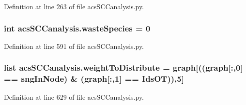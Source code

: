Definition at line 263 of file acs\-S\-C\-Canalysis.\-py.

\hypertarget{a00097_ace0de61f3c6aa14b4197156be3a68280}{
\subsubsection[{waste\-Species}]{\setlength{\rightskip}{0pt plus 5cm}int acs\-S\-C\-Canalysis.\-waste\-Species = 0}}\label{a00097_ace0de61f3c6aa14b4197156be3a68280}


Definition at line 591 of file acs\-S\-C\-Canalysis.\-py.

\hypertarget{a00097_a5162bfbe5eb2618736d1f77bb3125a9b}{
\subsubsection[{weight\-To\-Distribute}]{\setlength{\rightskip}{0pt plus 5cm}list acs\-S\-C\-Canalysis.\-weight\-To\-Distribute = {\bf graph}\mbox{[}(({\bf graph}\mbox{[}\-:,0\mbox{]} == sng\-In\-Node) \& ({\bf graph}\mbox{[}\-:,1\mbox{]} == Ids\-O\-T)),5\mbox{]}}}\label{a00097_a5162bfbe5eb2618736d1f77bb3125a9b}


Definition at line 629 of file acs\-S\-C\-Canalysis.\-py.

